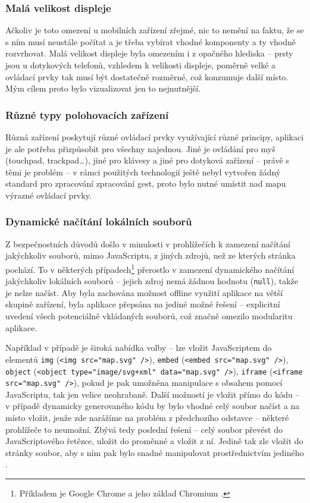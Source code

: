 \subsubsection{Malá velikost displeje}
Ačkoliv je toto omezení u mobilních zařízení zřejmé, nic to nemění na faktu, že se s ním musí neustále počítat a je třeba vybírat vhodné komponenty a ty vhodně rozvrhovat. Malá velikost displeje byla omezením i z opačného hlediska -- prsty jsou u dotykových telefonů, vzhledem k velikosti displeje, poměrně velké a ovládací prvky tak musí být dostatečně rozměrné, což konzumuje další místo. Mým cílem proto bylo vizualizovat jen to nejnutnější.

\subsubsection{Různé typy polohovacích zařízení}
Různá zařízení poskytují různé ovládací prvky využívající různé principy, aplikaci je ale potřeba přizpůsobit pro všechny najednou. Jiné je ovládání pro myš (touchpad, trackpad\dots), jiné pro klávesy a jiné pro dotyková zařízení -- právě s těmi je problém -- v rámci použitých technologií ještě nebyl vytvořen žádný standard pro zpracování zpracování gest, proto bylo nutné umístit nad mapu výrazné ovládací prvky.

\subsubsection{Dynamické načítání lokálních souborů}
Z bezpečnostních důvodů došlo v minulosti v prohlížečích k zamezení načítání jakýchkoliv souborů, mimo JavaScriptu, z jiných zdrojů, než ze kterých stránka pochází. To v některých případech\footnote{Příkladem je Google Chrome a jeho základ Chromium \cite{BugChromeOrigin}.} přerostlo v zamezení dynamického načítání jakýchkoliv lokálních souborů -- jejich zdroj nemá žádnou hodnotu (\texttt{null}), takže je nelze načíst. Aby byla zachována možnost offline využití aplikace na větší skupině zařízení, byla aplikace přepsána na jediné možné řešení -- explicitní uvedení všech potenciálně vkládaných souborů, což značně omezilo modularitu aplikace.

Například v případě  je široká nabídka volby -- lze vložit JavaScriptem do elementů \texttt{img} (\texttt{<img src="map.svg"\ />}), \texttt{embed} (\texttt{<embed src="map.svg"\ />}), \texttt{object} (\texttt{<object type="image/svg+xml"\ data="map.svg"\ />}), \texttt{iframe} (\texttt{<iframe src="map.svg"\ />}), pokud je pak umožněna manipulace s obsahem pomocí JavaScriptu, tak jen velice neohrabaně. Další možností je vložit  přímo do  kódu -- v případě dynamicky generovaného kódu by bylo vhodné celý soubor načíst a na místo vložit, jenže zde narážíme na problém z předchozího odstavce -- některé prohlížeče to neumožní. Zbývá tedy poslední řešení -- celý soubor převést do JavaScriptového řetězce, uložit do proměnné a vložit z ní. Jedině tak zle vložit do stránky  soubor, aby s ním pak bylo snadné manipulovat prostřednictvím jediného .


